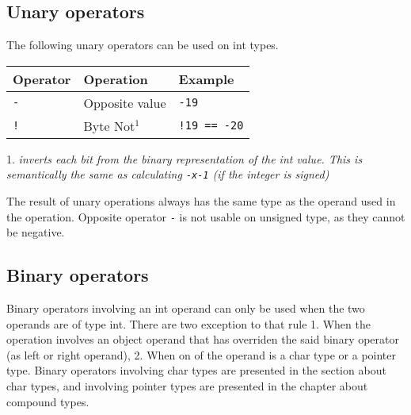 \subsection{Unary operators}
\label{sec:orge691bb5}

The following unary operators can be used on int types.
\smallskip


\begin{center}
  \vspace{-5pt}
  \begin{threeparttable}
    \begin{tabular}{|l|ll|}
      \hline
      Operator & Operation & Example\\[0pt]
      \hline
      \hline
      \texttt{-} & Opposite value & \texttt{-19}\\[0pt]
      \hline
      \texttt{!} & Byte Not\(^{1}\) & \texttt{!19 == -20}\\[0pt]
      \hline
    \end{tabular}
    \begin{tablenotes}

    \item[1.] \footnotesize \textit{inverts each bit from the binary representation of the int value. This is semantically the same as calculating \texttt{-x-1} (if the integer is signed)}

    \end{tablenotes}
  \end{threeparttable}
\end{center}

The result of unary operations always has the same type as the operand used in the operation. Opposite operator \texttt{-} is not usable on unsigned type, as they cannot be negative.


\subsection{Binary operators}
\label{sec:orgb91194f}

Binary operators involving an int operand can only be used when the two operands
are of type int. There are two exception to that rule 1. When the operation
involves an object operand that has overriden the said binary operator (as left
or right operand), 2. When on of the operand is a char type or a pointer type.
Binary operators involving char types are presented in the section about char
types, and involving pointer types are presented in the chapter about compound
types.

